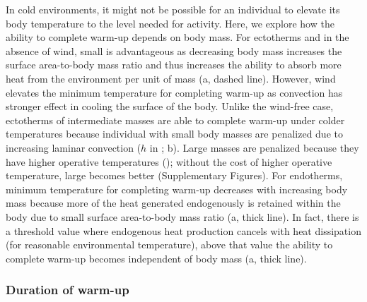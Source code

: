 In cold environments, it might not be possible for an individual to elevate its body temperature to the level needed for activity.
Here, we explore how the ability to complete warm-up depends on body mass.
For ectotherms and in the absence of wind, small is advantageous as decreasing body mass increases the surface area-to-body mass ratio and thus increases the ability to absorb more heat from the environment per unit of mass (a, dashed line).
However, wind elevates the minimum temperature for completing warm-up as convection has stronger effect in cooling the surface of the body.
Unlike the wind-free case, ectotherms of intermediate masses are able to complete warm-up under colder temperatures because individual with small body masses are penalized due to increasing laminar convection ($h$ in ; b).
Large masses are penalized because they have higher operative temperatures (); without the cost of higher operative temperature, large becomes better (Supplementary Figures).
For endotherms, minimum temperature for completing warm-up decreases with increasing body mass because more of the heat generated endogenously is retained within the body due to small surface area-to-body mass ratio (a, thick line).
In fact, there is a threshold value where endogenous heat production cancels with heat dissipation (for reasonable environmental temperature), above that value the ability to complete warm-up becomes independent of body mass (a, thick line).

\subsubsection*{Duration of warm-up}

